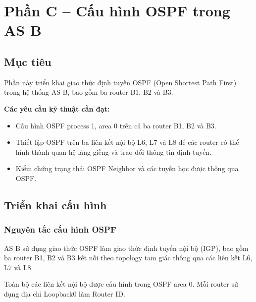 

\section{Phần C -- Cấu hình OSPF trong AS B}


\subsection{Mục tiêu}

Phần này triển khai giao thức định tuyến
OSPF (Open Shortest Path First) trong
hệ thống AS B, bao gồm ba router
B1, B2 và B3.

\textbf{Các yêu cầu kỹ thuật cần đạt:}

\begin{itemize}
    \item Cấu hình OSPF process 1,
    area 0 trên cả ba router B1, B2 và B3.

    \item Thiết lập OSPF trên ba liên kết
    nội bộ L6, L7 và L8 để các router
    có thể hình thành quan hệ láng giềng
    và trao đổi thông tin định tuyến.

    \item Kiểm chứng trạng thái
    OSPF Neighbor và các tuyến
    học được thông qua OSPF.
\end{itemize}



\subsection{Triển khai cấu hình}

\subsubsection{Nguyên tắc cấu hình OSPF}

AS B sử dụng giao thức OSPF làm giao thức
định tuyến nội bộ (IGP), bao gồm ba router
B1, B2 và B3 kết nối theo topology tam giác
thông qua các liên kết L6, L7 và L8.

Toàn bộ các liên kết nội bộ được cấu hình
trong OSPF area 0. Mỗi router sử dụng
địa chỉ Loopback0 làm Router ID.

